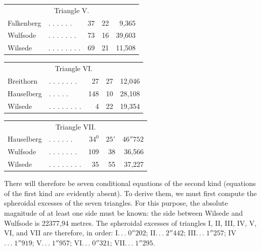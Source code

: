\begin{center}
\begin{tabular}{l l r r r}
\multicolumn{5}{c}{Triangle V.}\\[5pt]
Falkenberg&. . . . . .&37&22&9,365\\
Wulfsode&. . . . . . .&73&16&39,603\\
Wilsede&. . . . . . . .&69&21&11,508
\end{tabular}
\end{center}
\begin{center}
\begin{tabular}{l l r r r}
\multicolumn{5}{c}{Triangle VI.}\\[5pt]
Breithorn&. . . . . . .&27&27&12,046\\
Hauselberg&. . . . \hspace{.5em} .&148&10&28,108\\
Wilsede&. . . . . . . .&4&22&19,354
\end{tabular}
\end{center}
\begin{center}
\begin{tabular}{l l r r r}
\multicolumn{5}{c}{Triangle VII.}\\[5pt]
Hauselberg&. . . . . .&\(34^0\)&\(25'\)&\(46''752\)\\
Wulfsode&. . . . . . .&109&38&36,566\\
Wilsede&. . . . . . . .&35&55&37,227
\end{tabular}
\end{center}

There will therefore be seven conditional equations of the second kind (equations of the first kind are evidently absent). To derive them, we must first compute the spheroidal excesses of the seven triangles. For this purpose, the absolute magnitude of at least one side must be known: the side between Wilsede and Wulfsode is 22377,94 metres. The spheroidal excesses of triangles I, II, III, IV, V, VI, and VII are therefore, in order: I\(.\,.\,.\;0''202\); II\(.\,.\,.\;2''442\); III\(.\,.\,.\;1''257\); IV\(.\,.\,.\;1''919\); V\(.\,.\,.\;1''957\); VI\(.\,.\,.\;0''321\); VII\(.\,.\,.\;1''295\).

